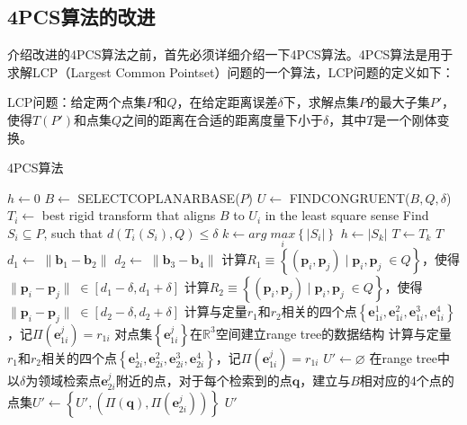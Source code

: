 \subsection{4PCS算法的改进}
介绍改进的4PCS算法之前，首先必须详细介绍一下4PCS算法。4PCS算法是用于求解LCP（Largest Common Pointset）问题的一个算法，LCP问题的定义如下：

{\kai LCP问题：给定两个点集$P$和$Q$，在给定距离误差$\delta$下，求解点集$P$的最大子集$P'$，使得$T(P')$和点集$Q$之间的距离在合适的距离度量下小于$\delta$，其中$T$是一个刚体变换。}

\begin{algorithm}
  \caption{4PCS算法}
  \label{alg:4pcs}
  $h\leftarrow 0$\;
   {
    $B\leftarrow$ SELECTCOPLANARBASE($P$)\;
    $U\leftarrow$ FINDCONGRUENT($B,Q,\delta$)\;
     {
      $T_i\leftarrow$ best rigid transform that aligns $B$ to $U_i$ in the least square sense\;
      Find $S_i\subseteq P$, such that $d(T_i(S_i), Q)\leq\delta$\;
    }
    $k\leftarrow arg\;\underset{i}{max}\left\{|S_i|\right\}$\;
     {
      $h\leftarrow |S_k|$\;
      $T\leftarrow T_k$\;
    }
    \Return $T$\;
  }
  \BlankLine
  \BlankLine
  \BlankLine
  \BlankLine
   {
    $d_1\leftarrow\;\parallel\mathbf{b}_1-\mathbf{b}_2\parallel$\;
    $d_2\leftarrow\;\parallel\mathbf{b}_3-\mathbf{b}_4\parallel$\;
    计算$R_1\equiv\left\{(\mathbf{p}_i,\mathbf{p}_j)\;|\;\mathbf{p}_i,\mathbf{p}_j\;\in Q\right\}$，使得$\parallel\mathbf{p}_i-\mathbf{p}_j\parallel\;\in [d_1-\delta,d_1+\delta]$\;
    计算$R_2\equiv\left\{(\mathbf{p}_i,\mathbf{p}_j)\;|\;\mathbf{p}_i,\mathbf{p}_j\;\in Q\right\}$，使得$\parallel\mathbf{p}_i-\mathbf{p}_j\parallel\;\in [d_2-\delta,d_2+\delta]$\;
     {
      计算与定量$r_1$和$r_2$相关的四个点$\left\{\mathbf{e}_{1i}^1,\mathbf{e}_{1i}^2,\mathbf{e}_{1i}^3,\mathbf{e}_{1i}^4\right\}$，记$\Pi(\mathbf{e}_{1i}^j)=r_{1i}$\;
    }
    对点集$\left\{\mathbf{e}_{1i}^j\right\}$在$\mathbb{R}^3$空间建立range tree的数据结构\;
     {
      计算与定量$r_1$和$r_2$相关的四个点$\left\{\mathbf{e}_{2i}^1,\mathbf{e}_{2i}^2,\mathbf{e}_{2i}^3,\mathbf{e}_{2i}^4\right\}$，记$\Pi(\mathbf{e}_{1i}^j)=r_{1i}$\;
    }
    $U'\leftarrow\varnothing$\;
     {
      在range tree中以$\delta$为领域检索点$\mathbf{e}_{2i}^j$附近的点，对于每个检索到的点$\mathbf{q}$，建立与$B$相对应的4个点的点集$U'\leftarrow\left\{U',(\Pi(\mathbf{q}),\Pi(\mathbf{e}_{2i}^j))\right\}$\;
    }
    \Return $U'$\;
  }
\end{algorithm}

